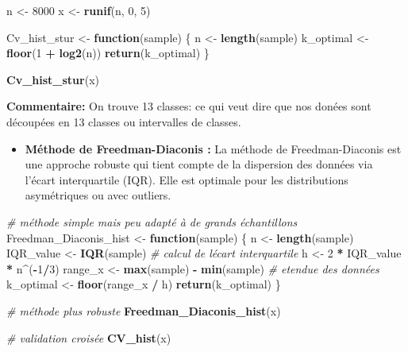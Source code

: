 \documentclass[
  12pt,
]{article}
\newenvironment{Shaded}{\begin{snugshade}}{\end{snugshade}}
\newcommand{\CommentTok}[1]{\textcolor[rgb]{0.56,0.35,0.01}{\textit{#1}}}
\newcommand{\ControlFlowTok}[1]{\textcolor[rgb]{0.13,0.29,0.53}{\textbf{#1}}}
\newcommand{\DecValTok}[1]{\textcolor[rgb]{0.00,0.00,0.81}{#1}}
\newcommand{\FunctionTok}[1]{\textcolor[rgb]{0.13,0.29,0.53}{\textbf{#1}}}
\newcommand{\NormalTok}[1]{#1}
\newcommand{\OtherTok}[1]{\textcolor[rgb]{0.56,0.35,0.01}{#1}}
\newcommand{\SpecialCharTok}[1]{\textcolor[rgb]{0.81,0.36,0.00}{\textbf{#1}}}
\providecommand{\tightlist}{%
  \setlength{\itemsep}{0pt}\setlength{\parskip}{0pt}}
\begin{document}
\begin{Shaded}
\begin{Highlighting}[]
\NormalTok{n }\OtherTok{\textless{}{-}} \DecValTok{8000}
\NormalTok{x }\OtherTok{\textless{}{-}} \FunctionTok{runif}\NormalTok{(n, }\DecValTok{0}\NormalTok{, }\DecValTok{5}\NormalTok{)}

\NormalTok{Cv\_hist\_stur }\OtherTok{\textless{}{-}} \ControlFlowTok{function}\NormalTok{(sample) \{}
\NormalTok{  n }\OtherTok{\textless{}{-}} \FunctionTok{length}\NormalTok{(sample)}
\NormalTok{  k\_optimal }\OtherTok{\textless{}{-}} \FunctionTok{floor}\NormalTok{(}\DecValTok{1} \SpecialCharTok{+} \FunctionTok{log2}\NormalTok{(n))}
  \FunctionTok{return}\NormalTok{(k\_optimal)}
\NormalTok{\}}

\FunctionTok{Cv\_hist\_stur}\NormalTok{(x)}
\end{Highlighting}
\end{Shaded}

\textbf{Commentaire:} On trouve 13 classes: ce qui veut dire que nos
donées sont découpées en 13 classes ou intervalles de classes.

\begin{itemize}
\tightlist
\item
  \textbf{Méthode de Freedman-Diaconis : } La méthode de
  Freedman-Diaconis est une approche robuste qui tient compte de la
  dispersion des données via l'écart interquartile (IQR). Elle est
  optimale pour les distributions asymétriques ou avec outliers.
\end{itemize}

\begin{Shaded}
\begin{Highlighting}[]
\CommentTok{\# méthode simple mais peu adapté à de grands échantillons}
\NormalTok{Freedman\_Diaconis\_hist }\OtherTok{\textless{}{-}} \ControlFlowTok{function}\NormalTok{(sample) \{}
\NormalTok{  n }\OtherTok{\textless{}{-}} \FunctionTok{length}\NormalTok{(sample)}
\NormalTok{  IQR\_value }\OtherTok{\textless{}{-}} \FunctionTok{IQR}\NormalTok{(sample) }\CommentTok{\# calcul de l\textquotesingle{}écart interquartile}
\NormalTok{  h }\OtherTok{\textless{}{-}} \DecValTok{2} \SpecialCharTok{*}\NormalTok{ IQR\_value }\SpecialCharTok{*}\NormalTok{ n}\SpecialCharTok{\^{}}\NormalTok{(}\SpecialCharTok{{-}}\DecValTok{1}\SpecialCharTok{/}\DecValTok{3}\NormalTok{) }
\NormalTok{  range\_x }\OtherTok{\textless{}{-}} \FunctionTok{max}\NormalTok{(sample) }\SpecialCharTok{{-}} \FunctionTok{min}\NormalTok{(sample) }\CommentTok{\# etendue des données }
\NormalTok{  k\_optimal }\OtherTok{\textless{}{-}} \FunctionTok{floor}\NormalTok{(range\_x }\SpecialCharTok{/}\NormalTok{ h)}
  \FunctionTok{return}\NormalTok{(k\_optimal)}
\NormalTok{\}}

\CommentTok{\# méthode plus robuste}
\FunctionTok{Freedman\_Diaconis\_hist}\NormalTok{(x) }

\CommentTok{\# validation croisée }
\FunctionTok{CV\_hist}\NormalTok{(x)}
\end{Highlighting}
\end{Shaded}
\end{document}

